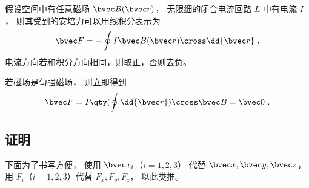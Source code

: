 

假设空间中有任意磁场 $\bvec B(\bvec r)$， 无限细的闭合电流回路 $L$ 中有电流 $I$， 则其受到的安培力可以用线积分表示为
\begin{equation}
\bvec F = -\oint I \bvec B(\bvec r)\cross\dd{\bvec r} ~.
\end{equation}
电流方向若和积分方向相同，则取正，否则去负。

若磁场是匀强磁场， 则立即得到
\begin{equation}
\bvec F = I\qty(\oint \dd{\bvec r}) \cross \bvec B = \bvec 0~.
\end{equation}

\subsection{证明}

下面为了书写方便， 使用 $\bvec x_i$（$i=1,2,3$） 代替 $\bvec x, \bvec y, \bvec z$， 用 $F_i$（$i=1,2,3$）代替 $F_x, F_y, F_z$， 以此类推。

